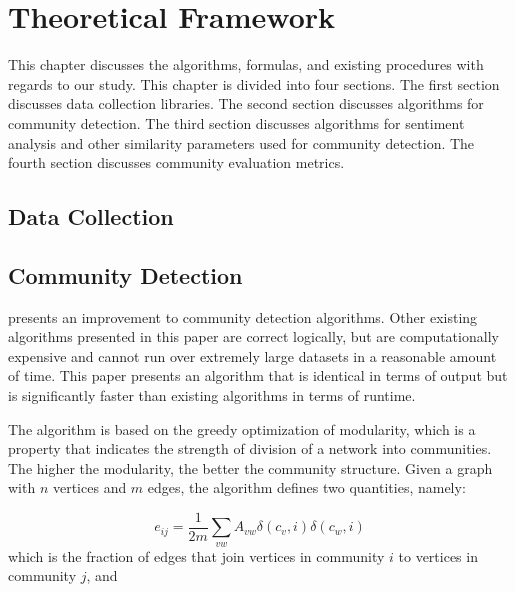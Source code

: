 %
%
%                 

\chapter{Theoretical Framework}
\label{sec:theoframe}

This chapter discusses the algorithms, formulas, and existing procedures with regards to our study. This chapter is divided into four sections. The first section discusses data collection libraries. The second section discusses algorithms for community detection. The third section discusses algorithms for sentiment analysis and other similarity parameters used for community detection. The fourth section discusses community evaluation metrics.

\section{Data Collection}



\section{Community Detection}

 presents an improvement to community detection algorithms. Other existing algorithms presented in this paper are correct logically, but are computationally expensive and cannot run over extremely large datasets in a reasonable amount of time. This paper presents an algorithm that is identical in terms of output but is significantly faster than existing algorithms in terms of runtime.

The algorithm is based on the greedy optimization of modularity, which is a property that indicates the strength of division of a network into communities. The higher the modularity, the better the community structure. Given a graph with $n$ vertices and $m$ edges, the algorithm defines two quantities, namely:

\begin{equation}
	e_{ij} = \frac{1}{2m} \sum_{vw}{A_{vw}\delta(c_v,i)\delta(c_w,i)}
\end{equation}which is the fraction of edges that join vertices in community $i$ to vertices in community $j$, and

